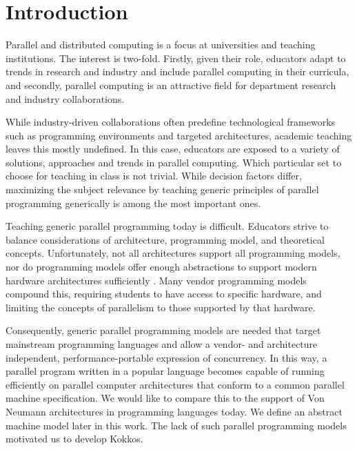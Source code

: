 
\section{Introduction}\label{chap:introduction}

Parallel and distributed computing is a focus at universities and teaching institutions. The interest is two-fold. Firstly, given their role, educators adapt to trends in research and industry and include parallel computing in their curricula, and secondly, parallel computing is an attractive field for department research and industry collaborations. 

While industry-driven collaborations often predefine technological frameworks such as programming environments and targeted architectures, academic teaching leaves this mostly undefined. In this case, educators are exposed to a variety of solutions, approaches and trends in parallel computing. Which particular set to choose for teaching in class is not trivial. While decision factors differ, maximizing the subject relevance by teaching generic principles of parallel programming generically is among the most important ones. 

Teaching generic parallel programming today is difficult. Educators strive to balance considerations of architecture, programming model, and theoretical concepts. Unfortunately, not all architectures support all programming models, nor do programming models offer enough abstractions to support modern hardware architectures sufficiently . Many vendor programming models compound this, requiring students to have access to specific hardware, and limiting the concepts of parallelism to those supported by that hardware. 

Consequently, generic parallel programming models are needed that target mainstream programming languages and allow a vendor- and architecture independent, performance-portable expression of concurrency. In this way, a parallel program written in a popular language becomes capable of running efficiently on parallel computer architectures that conform to a common parallel machine specification. We would like to compare this to the support of Von Neumann architectures in programming languages today. We define an abstract machine model later in this work. The lack of such parallel programming models motivated us to develop Kokkos.


